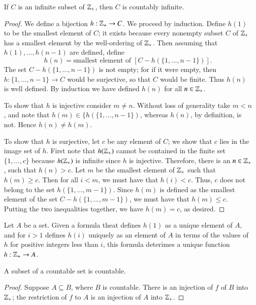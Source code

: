     \begin{lemma}
        If $C$ is an infinite subset of $\mathbb Z_+$, then $C$ is countably infinite.
    \end{lemma}
    \begin{proof}
        We define a bijection $h:\mathbb Z_+\rightarrow C$. We proceed by induction. Define $h(1)$ to be the smallest element of $C$; it exists because every nonempty subset $C$ of $\mathbb Z_+$ has a smallest element by the well-ordering of $\mathbb Z_+$. Then assuming that $h(1),...,h(n-1)$ are defined, define \begin{equation*}
            h(n) = \text{smallest element of } [C-h(\{1,...,n-1\})].
        \end{equation*}
        The set $C-h(\{1,...,n-1\})$ is not empty; for if it were empty, then $h:\{1,...,n-1\}\rightarrow C$ would be surjective, so that $C$ would be finite. Thus $h(n)$ is well defined. By induction we have defined $h(n)$ for all $n \in \mathbb Z_+$.


        To show that $h$ is injective consider $m \neq n$. Without loss of generality take $m < n$, and note that $h(m) \in \{h(\{1,...,n-1\})$, whereas $h(n)$, by definition, is not. Hence $h(n) \neq h(m)$.

        To show that $h$ is surjective, let $c$ be any element of $C$; we show that $c$ lies in the image set of $h$. First note that $h(\mathbb Z_+)$ cannot be contained in the finite set $\{1,...,c\}$ because $h(\mathbb Z_+)$ is infinite since $h$ is injective. Therefore, there is an $n \in \mathbb Z_+$, such that $h(n) > c$. Let $m$ be the smallest element of $\mathbb Z_+$ such that $h(m) \geq c$. Then for all $i < m$, we must have that $h(i) < c$. Thus, $c$ does not belong to the set $h(\{1,...,m-1\})$. Since $h(m)$ is defined as the smallest element of the set $C-h(\{1,...,m-1\})$, we must have that $h(m) \leq c$. Putting the two inequalities together, we have $h(m) = c$, as desired.
    \end{proof}


    \begin{definition}
        Let $A$ be a set. Given a formula theat defines $h(1)$ as a unique element of $A$, and for $i > 1$ defines $h(i)$ uniquely as an element of $A$ in terms of the values of $h$ for positive integers less than $i$, this formula deterimes a unique function $h:\mathbb Z_+\rightarrow A$.
    \end{definition}


    \begin{corollary}
        A subset of a countable set is countable.
    \end{corollary}
    \begin{proof}
        Suppose $A \subseteq B$, where $B$ is countable. There is an injection of $f$ of $B$ into $\mathbb Z_+$; the restriction of $f$ to $A$ is an injection of $A$ into $\mathbb Z_+$.
    \end{proof}


